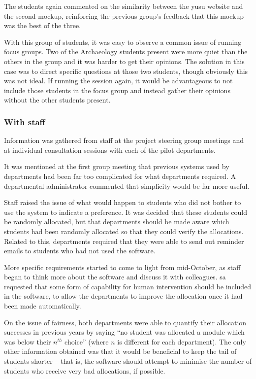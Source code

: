 The students again commented on the similarity between the \gls{yusu} website
and the second mockup, reinforcing the previous group's feedback that this
mockup was the best of the three.

With this group of students, it was easy to observe a common issue of running
focus groups. Two of the Archaeology students present were more quiet than the
others in the group and it was harder to get their opinions. The solution in
this case was to direct specific questions at those two students, though
obviously this was not ideal. If running the session again, it would be
advantageous to not include those students in the focus group and instead
gather their opinions without the other students present.

\subsubsection{With staff}

Information was gathered from staff at the project steering group meetings and
at individual consultation sessions with each of the pilot departments.

It was mentioned at the first group meeting that previous systems used by
departments had been far too complicated for what departments required. A
departmental administrator commented that simplicity would be far more useful.

Staff raised the issue of what would happen to students who did not bother to
use the system to indicate a preference. It was decided that these students
could be randomly allocated, but that departments should be made aware which
students had been randomly allocated so that they could verify the
allocations. Related to this, departments required that they were able to send
out reminder emails to students who had not used the software.

More specific requirements started to come to light from mid-October, as staff
began to think more about the software and discuss it with colleagues.
\gls{sa} requested that some form of capability for human intervention should
be included in the software, to allow the departments to improve the allocation
once it had been made automatically.

On the issue of fairness, both departments were able to quantify their
allocation successes in previous years by saying ``no student was allocated a
module which was below their $n^{th}$ choice'' (where $n$ is different for
each department). The only other information obtained was that it would be
beneficial to keep the tail of students shorter -- that is, the software should attempt
to minimise the number of students who receive very bad allocations, if
possible.

